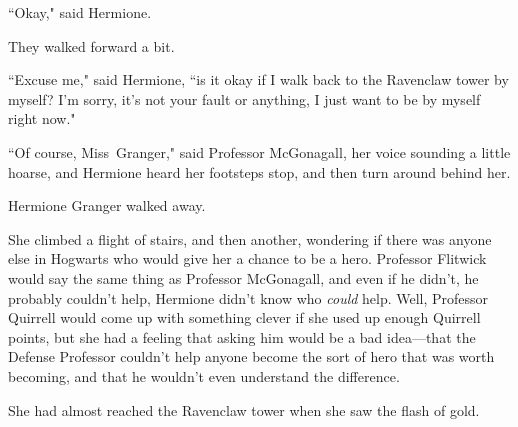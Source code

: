 ``Okay," said Hermione.

They walked forward a bit.

``Excuse me," said Hermione, ``is it okay if I walk back to the Ravenclaw tower by myself? I'm sorry, it's not your fault or anything, I just want to be by myself right now."

``Of course, Miss~Granger," said Professor McGonagall, her voice sounding a little hoarse, and Hermione heard her footsteps stop, and then turn around behind her.

Hermione Granger walked away.

She climbed a flight of stairs, and then another, wondering if there was anyone else in Hogwarts who would give her a chance to be a hero. Professor Flitwick would say the same thing as Professor McGonagall, and even if he didn't, he probably couldn't help, Hermione didn't know who \emph{could} help. Well, Professor Quirrell would come up with something clever if she used up enough Quirrell points, but she had a feeling that asking him would be a bad idea—that the Defense Professor couldn't help anyone become the sort of hero that was worth becoming, and that he wouldn't even understand the difference.

She had almost reached the Ravenclaw tower when she saw the flash of gold.

